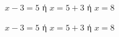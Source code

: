 \begin{alist}
\item $ x-3=5 $ ή $ x=5+3 $ ή $ x=8 $
\end{alist}
\begin{alist}
\item $ x-3=5 $ ή $ x=5+3 $ ή $ x=8 $
\end{alist}
